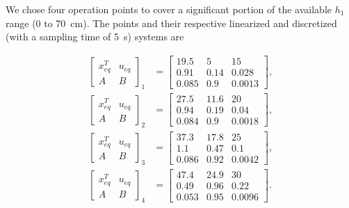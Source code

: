 We chose four operation points to cover a significant portion of the available
\(h_{1}\) range (0 to \SI{70}{\centi\metre}). The points and their respective
linearized and discretized (with a sampling time of \SI{5}{\second}) systems are

\begin{align}
	\label{eq:op-points}
	\left[\begin{array}{c|c}
			x_{eq}^{T} & u_{eq} \\
			\hline
			A          & B
		\end{array}\right]_{1}  & = \left[\begin{array}{cc|c}
			19.5  & 5    & 15     \\
			\hline
			0.91  & 0.14 & 0.028  \\
			0.085 & 0.9  & 0.0013
		\end{array}\right],  \\
	\left[\begin{array}{c|c}
			x_{eq}^{T} & u_{eq} \\
			\hline
			A          & B
		\end{array}\right]_{2}  & = \left[\begin{array}{cc|c}
			27.5  & 11.6 & 20     \\
			\hline
			0.94  & 0.19 & 0.04   \\
			0.084 & 0.9  & 0.0018
		\end{array}\right], \\
	\left[\begin{array}{c|c}
			x_{eq}^{T} & u_{eq} \\
			\hline
			A          & B
		\end{array}\right]_{3} & = \left[\begin{array}{cc|c}
			37.3  & 17.8 & 25     \\
			\hline
			1.1   & 0.47 & 0.1    \\
			0.086 & 0.92 & 0.0042
		\end{array}\right], \\
	\left[\begin{array}{c|c}
			x_{eq}^{T} & u_{eq} \\
			\hline
			A          & B
		\end{array}\right]_{4} & = \left[\begin{array}{cc|c}
			47.4  & 24.9 & 30     \\
			\hline
			0.49  & 0.96 & 0.22   \\
			0.053 & 0.95 & 0.0096
		\end{array}\right].
\end{align}

